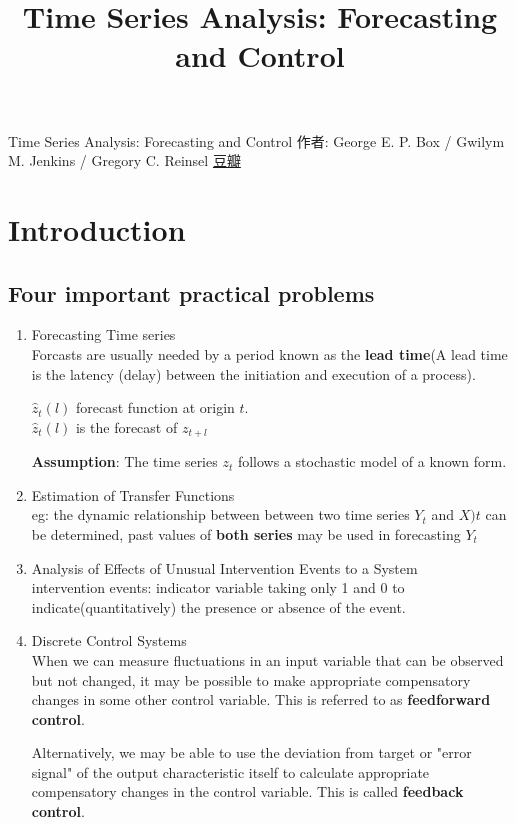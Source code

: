 \documentclass{article}
\begin{document}
\title{Time Series Analysis: Forecasting and Control}
\author{}
\maketitle
\tableofcontents
\newpage

Time Series Analysis: Forecasting and Control
作者: George E. P. Box / Gwilym M. Jenkins / Gregory C. Reinsel
\href{http://book.douban.com/subject/4159347/}{豆瓣}

\section{Introduction}
\subsection{Four important practical problems}
\begin{enumerate}
\item{Forecasting Time series}\\
Forcasts are usually needed by a period known as the \textbf{lead time}(A lead time is the latency (delay)
between the initiation and execution of a process).

$\hat{z}_t(l)$ forecast function at origin $t$.\\
$\hat{z}_t(l)$ is the forecast of $z_{t+l}$

\textbf{Assumption}: The time series $z_t$ follows a stochastic model of a known form.

\item{Estimation of Transfer Functions}\\
eg: the dynamic relationship between between two time series $Y_t$ and $X)t$ can be determined, past values of \textbf{both series} may be used in
forecasting $Y_t$

\item {Analysis of Effects of Unusual Intervention Events to a System}\\
intervention events: indicator variable taking only 1 and 0 to indicate(quantitatively) the presence or absence of the event.

\item {Discrete Control Systems}\\
When we can measure fluctuations in an input variable that can be observed but not changed, it may be possible to make appropriate compensatory changes
in some other control variable. This is referred to as \textbf{feedforward control}.

Alternatively, we may be able to use the deviation from target or "error signal" of the output characteristic itself to calculate appropriate
compensatory changes in the control variable. This is called \textbf{feedback control}.
\end{enumerate}
\end{document}
